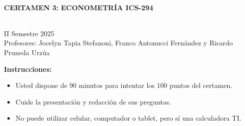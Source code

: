 \documentclass[10pt,a4paper]{article}
\begin{document}
\vspace{5cm}



\begin{center}
\begin{large}
\textbf{\\CERTAMEN 3:}\textbf{ ECONOMETRÍA ICS-294}
\end{large}\\
\vspace{0.2cm}
II Semestre 2025\\
Profesores: Jocelyn Tapia Stefanoni, Franco Antonucci Fernández y Ricardo Pruneda Urz\'ua\\
\end{center}

\textbf{Instrucciones:} 

\begin{itemize}

    \item Usted dispone de 90 minutos  para intentar los 100 puntos del certamen.
    \item Cuide la presentación y redacción de sus preguntas.
    \item No puede utilizar celular, computador o tablet, pero sí una calculadora TI.
     
\end{itemize}
\end{document}

